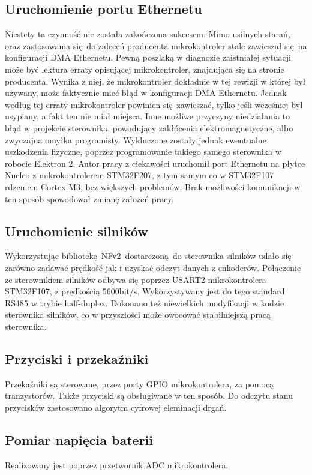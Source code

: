 \documentclass[a4paper, 12pt]{article}
\begin{document}
	\subsection{Uruchomienie portu Ethernetu}
	Niestety ta czynność nie została zakończona sukcesem. Mimo usilnych starań, oraz zastosowania się do zaleceń producenta mikrokontroler stale zawieszał się na konfiguracji DMA Ethernetu. Pewną poszlaką w diagnozie zaistniałej sytuacji może być lektura erraty opisującej mikrokontroler, znajdująca się na stronie producenta. Wynika z niej, że mikrokontroler dokładnie w tej rewizji w której był używany, może faktycznie mieć błąd w konfiguracji DMA Ethernetu. Jednak według tej erraty mikrokontroler powinien się zawieszać, tylko jeśli wcześniej był usypiany, a fakt ten nie miał miejsca\cite{STMErrata}. Inne możliwe przyczyny niedziałania to błąd w projekcie sterownika, powodujący zakłócenia elektromagnetyczne, albo zwyczajna omyłka programisty. Wykluczone zostały jednak ewentualne uszkodzenia fizyczne, poprzez programowanie takiego samego sterownika w robocie Elektron 2. Autor pracy z ciekawości uruchomił port Ethernetu na płytce Nucleo z mikrokontrolerem STM32F207, z tym samym co w STM32F107 rdzeniem Cortex M3, bez większych problemów. Brak możliwości komunikacji w ten sposób spowodował zmianę założeń pracy.
	\subsection{Uruchomienie silników}
	Wykorzystując bibliotekę NFv2 dostarczoną do sterownika silników udało się zarówno zadawać prędkość jak i uzyskać odczyt danych z enkoderów. Połączenie ze sterownikiem silników odbywa się poprzez USART2 mikrokontrolera STM32F107, z prędkością 5600bit/s. Wykorzystywany jest do tego standard RS485 w trybie half-duplex. Dokonano też niewielkich modyfikacji w kodzie sterownika silników, co w przyszłości może owocować stabilniejszą pracą sterownika.
	\subsection{Przyciski i przekaźniki}
	Przekaźniki są sterowane, przez porty GPIO mikrokontrolera, za pomocą tranzystorów. Także przyciski są obsługiwane w ten sposób. Do odczytu stanu przycisków zastosowano algorytm cyfrowej eleminacji drgań.
	\subsection{Pomiar napięcia baterii}
	Realizowany jest poprzez przetwornik ADC mikrokontrolera.
\end{document}
